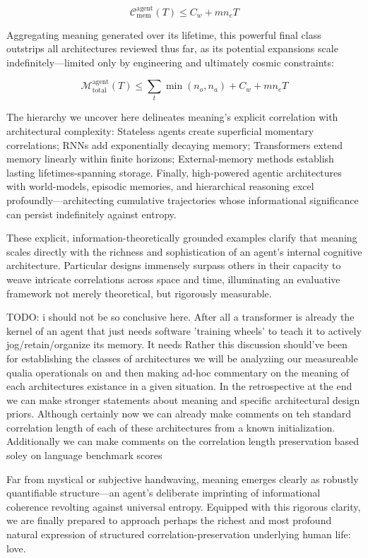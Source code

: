 \begin{equation*}
\mathcal{C}_{\text{mem}}^{\text{agent}}(T) \leq C_w + m n_e T
\end{equation*}

Aggregating meaning generated over its lifetime, this powerful final class outstrips all architectures reviewed thus far, as its potential expansions scale indefinitely---limited only by engineering and ultimately cosmic constraints:

\begin{equation*}
\mathcal{M}_{\text{total}}^{\text{agent}}(T) \leq \sum_t \min(n_o,n_a) + C_w + m n_e T
\end{equation*}

The hierarchy we uncover here delineates meaning's explicit correlation with architectural complexity: Stateless agents create superficial momentary correlations; RNNs add exponentially decaying memory; Transformers extend memory linearly within finite horizons; External-memory methods establish lasting lifetimes-spanning storage. Finally, high-powered agentic architectures with world-models, episodic memories, and hierarchical reasoning excel profoundly---architecting cumulative trajectories whose informational significance can persist indefinitely against entropy.

These explicit, information-theoretically grounded examples clarify that meaning scales directly with the richness and sophistication of an agent's internal cognitive architecture. Particular designs immensely surpass others in their capacity to weave intricate correlations across space and time, illuminating an evaluative framework not merely theoretical, but rigorously measurable.

TODO: i should not be so conclusive here. After all a transformer is already the kernel of an agent that just needs software 'training wheels' to teach it to actively jog/retain/organize its memory. It needs 
Rather this discussion should've been for establishing the classes of architectures we will be analyziing our measureable qualia operationals on and then making ad-hoc commentary on the meaning of each architectures existance in a given situation. In the retrospective at the end we can make stronger statements about meaning and specific architectural design priors. Although certainly now we can already make comments on teh standard correlation length of each of these architectures from a known initialization. Additionally we can make comments on the correlation length preservation based soley on language benchmark scores

Far from mystical or subjective handwaving, meaning emerges clearly as robustly quantifiable structure---an agent's deliberate imprinting of informational coherence revolting against universal entropy. Equipped with this rigorous clarity, we are finally prepared to approach perhaps the richest and most profound natural expression of structured correlation-preservation underlying human life: love.
